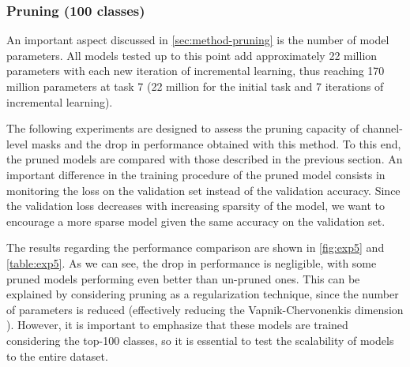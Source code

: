 \newpage
\subsubsection{Pruning (100 classes)}
An important aspect discussed in \autoref{sec:method-pruning} is the number of model parameters. All models tested up to this point add approximately 22 million parameters with each new iteration of incremental learning, thus reaching 170 million parameters at task 7 (22 million for the initial task and 7 iterations of incremental learning).

The following experiments are designed to assess the pruning capacity of channel-level masks and the drop in performance obtained with this method. To this end, the pruned models are compared with those described in the previous section. An important difference in the training procedure of the pruned model consists in monitoring the loss on the validation set instead of the validation accuracy.
Since the validation loss decreases with increasing sparsity of the model, we want to encourage a more sparse model given the same accuracy on the validation set.

The results regarding the performance comparison are shown in \autoref{fig:exp5} and \autoref{table:exp5}. As we can see, the drop in performance is negligible, with some pruned models performing even better than un-pruned ones. This can be explained by considering pruning as a regularization technique, since the number of parameters is reduced (effectively reducing the Vapnik-Chervonenkis dimension \cite{vapnik1999nature}). However, it is important to emphasize that these models are trained considering the top-100 classes, so it is essential to test the scalability of models to the entire dataset.

